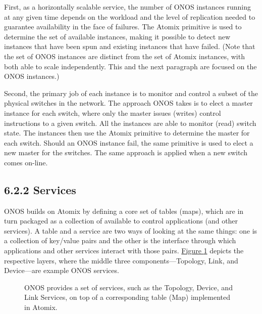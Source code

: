 \documentclass[letterpaper,11pt,english]{sphinxmanual}
\let\sphinxpxdimen\pdfpxdimen\else\newdimen\sphinxpxdimen
\begin{document}
First, as a horizontally scalable service, the number of ONOS
instances running at any given time depends on the workload and the
level of replication needed to guarantee availability in the face of
failures. The Atomix  primitive is used to determine
the set of available instances, making it possible to detect new
instances that have been spun and existing instances that have
failed. (Note that the set of ONOS instances are distinct from the set
of Atomix instances, with both able to scale independently. This and
the next paragraph are focused on the ONOS instances.)

Second, the primary job of each instance is to monitor and control a
subset of the physical switches in the network. The approach ONOS
takes is to elect a master instance for each switch, where only the
master issues (writes) control instructions to a given switch. All the
instances are able to monitor (read) switch state. The instances then
use the Atomix  primitive to determine the master for
each switch. Should an ONOS instance fail, the same primitive is used
to elect a new master for the switches. The same approach is applied
when a new switch comes on-line.


\subsection{6.2.2 Services}
\label{\detokenize{onos:services}}
ONOS builds on Atomix by defining a core set of tables (maps), which
are in turn packaged as a collection of  available to
control applications (and other services). A table and a service are
two ways of looking at the same things: one is a collection of
key/value pairs and the other is the interface through which
applications and other services interact with those pairs.
\hyperref[\detokenize{onos:fig-services1}]{Figure \ref{\detokenize{onos:fig-services1}}} depicts the respective layers,
where the middle three components—Topology, Link, and Device—are
example ONOS services.

\begin{figure}[htbp]
\centering
\capstart

\noindent\sphinxincludegraphics[width=350\sphinxpxdimen]{{Slide29}.png}
\caption{ONOS provides a set of services, such as the Topology, Device, and
Link Services, on top of a corresponding table (Map) implemented
in Atomix.}\label{\detokenize{onos:id8}}\label{\detokenize{onos:fig-services1}}\end{figure}
\end{document}
